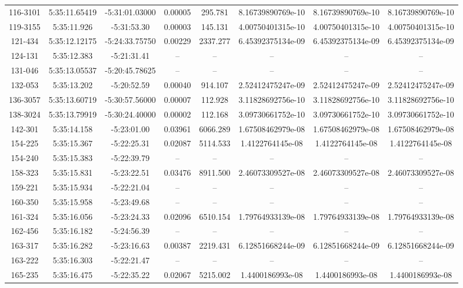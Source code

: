 \begin{table}
\begin{tabular}{cccccccc}
116-3101 & 5:35:11.65419 & -5:31:01.03000 & 0.00005 & 295.781 & 8.16739890769e-10 & 8.16739890769e-10 & 8.16739890769e-10 \\
119-3155 & 5:35:11.926 & -5:31:53.30 & 0.00003 & 145.131 & 4.00750401315e-10 & 4.00750401315e-10 & 4.00750401315e-10 \\
121-434 & 5:35:12.12175 & -5:24:33.75750 & 0.00229 & 2337.277 & 6.45392375134e-09 & 6.45392375134e-09 & 6.45392375134e-09 \\
124-131 & 5:35:12.383 & -5:21:31.41 & -- & -- & -- & -- & -- \\
131-046 & 5:35:13.05537 & -5:20:45.78625 & -- & -- & -- & -- & -- \\
132-053 & 5:35:13.202 & -5:20:52.59 & 0.00040 & 914.107 & 2.52412475247e-09 & 2.52412475247e-09 & 2.52412475247e-09 \\
136-3057 & 5:35:13.60719 & -5:30:57.56000 & 0.00007 & 112.928 & 3.11828692756e-10 & 3.11828692756e-10 & 3.11828692756e-10 \\
138-3024 & 5:35:13.79919 & -5:30:24.40000 & 0.00002 & 112.168 & 3.09730661752e-10 & 3.09730661752e-10 & 3.09730661752e-10 \\
142-301 & 5:35:14.158 & -5:23:01.00 & 0.03961 & 6066.289 & 1.67508462979e-08 & 1.67508462979e-08 & 1.67508462979e-08 \\
154-225 & 5:35:15.367 & -5:22:25.31 & 0.02087 & 5114.533 & 1.4122764145e-08 & 1.4122764145e-08 & 1.4122764145e-08 \\
154-240 & 5:35:15.383 & -5:22:39.79 & -- & -- & -- & -- & -- \\
158-323 & 5:35:15.831 & -5:23:22.51 & 0.03476 & 8911.500 & 2.46073309527e-08 & 2.46073309527e-08 & 2.46073309527e-08 \\
159-221 & 5:35:15.934 & -5:22:21.04 & -- & -- & -- & -- & -- \\
160-350 & 5:35:15.958 & -5:23:49.68 & -- & -- & -- & -- & -- \\
161-324 & 5:35:16.056 & -5:23:24.33 & 0.02096 & 6510.154 & 1.79764933139e-08 & 1.79764933139e-08 & 1.79764933139e-08 \\
162-456 & 5:35:16.182 & -5:24:56.39 & -- & -- & -- & -- & -- \\
163-317 & 5:35:16.282 & -5:23:16.63 & 0.00387 & 2219.431 & 6.12851668244e-09 & 6.12851668244e-09 & 6.12851668244e-09 \\
163-222 & 5:35:16.303 & -5:22:21.47 & -- & -- & -- & -- & -- \\
165-235 & 5:35:16.475 & -5:22:35.22 & 0.02067 & 5215.002 & 1.4400186993e-08 & 1.4400186993e-08 & 1.4400186993e-08 \\

\end{tabular}
\end{table}
